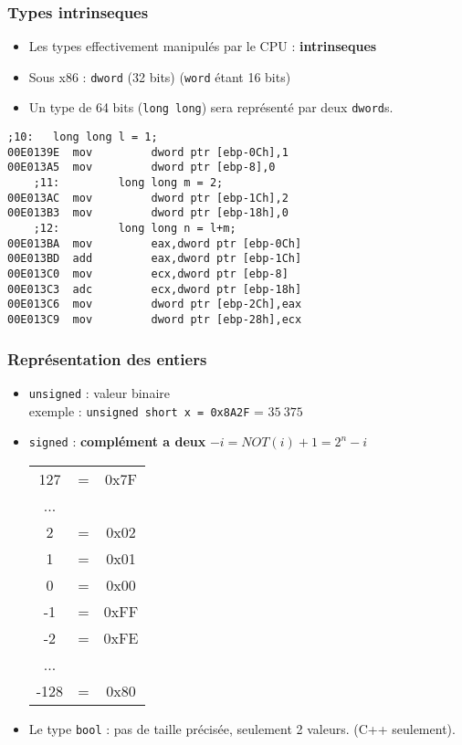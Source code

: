 \documentclass{beamer}
\begin{document}
\begin{frame}[fragile]
\frametitle{Types intrinseques}

\begin{itemize}
\item Les types effectivement manipulés par le CPU : \textbf{intrinseques}
\item Sous x86 : \lstinline[language={[x86masm]Assembler}]+dword+ (32 bits) (\lstinline+word+ étant 16 bits)
\item Un type de 64 bits (\lstinline+long long+) sera représenté par deux \lstinline[language={[x86masm]Assembler}]+dword+s.
\end{itemize}

\begin{lstlisting}[language={[x86masm]Assembler}]
    ;10:   long long l = 1;
00E0139E  mov         dword ptr [ebp-0Ch],1  
00E013A5  mov         dword ptr [ebp-8],0  
    ;11:         long long m = 2;
00E013AC  mov         dword ptr [ebp-1Ch],2  
00E013B3  mov         dword ptr [ebp-18h],0  
    ;12:         long long n = l+m;
00E013BA  mov         eax,dword ptr [ebp-0Ch]  
00E013BD  add         eax,dword ptr [ebp-1Ch]  
00E013C0  mov         ecx,dword ptr [ebp-8]  
00E013C3  adc         ecx,dword ptr [ebp-18h]  
00E013C6  mov         dword ptr [ebp-2Ch],eax  
00E013C9  mov         dword ptr [ebp-28h],ecx 
\end{lstlisting}

\end{frame}

\begin{frame}
\frametitle{Représentation des entiers}
\begin{itemize}
\item \lstinline+unsigned+ : valeur binaire\\
exemple : \lstinline+unsigned short x = 0x8A2F+ = $35~375$

\item \lstinline+signed+ : \textbf{complément a deux} $ -i  = NOT(i) + 1 = 2^n - i $
 \begin{tabular}{c c c}
 127 & = & 0x7F\\
 ...& & \\
 2 & = & 0x02\\
 1 & = & 0x01\\
 0 & = & 0x00\\
-1 & = & 0xFF\\
-2 & = & 0xFE \\
...& &  \\
-128 & =&  0x80
\end{tabular}

\item Le type \lstinline +bool+ : pas de taille précisée, seulement 2 valeurs. (C++ seulement). 

\end{itemize}
\end{frame}
\end{document}
